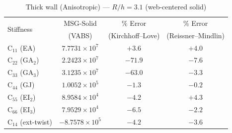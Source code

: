 \begin{table}[htpb]
\centering
\caption{Thick wall (Anisotropic) --- $R/h = 3.1$ (web-centered solid)}
\label{tab:multicell2_aniso_thick}
\begin{tabular}{lccc}
\hline
\multirow{2}{*}{Stiffness} & MSG-Solid & $\%$ Error & $\%$ Error\\
 & (VABS) & (Kirchhoff--Love) & (Reissner--Mindlin) \\
\hline
C$_{11}$ (EA) & $7.7731 \times 10^{7}$ & $+3.6$ & $+4.0$ \\
C$_{22}$ (GA$_2$) & $2.2423 \times 10^{7}$ & $-71.9$ & $-7.6$ \\
C$_{33}$ (GA$_3$) & $3.1235 \times 10^{7}$ & $-63.0$ & $-3.3$ \\
C$_{44}$ (GJ) & $1.0052 \times 10^{5}$ & $-1.3$ & $-0.2$ \\
C$_{55}$ (EI$_2$) & $8.9584 \times 10^{4}$ & $-4.2$ & $+4.3$ \\
C$_{66}$ (EI$_3$) & $7.9529 \times 10^{4}$ & $-6.5$ & $-2.2$ \\
C$_{14}$ (ext-twist) & $-8.7578 \times 10^{5}$ & $-4.2$ & $-3.6$ \\
\hline
\end{tabular}
\end{table}
